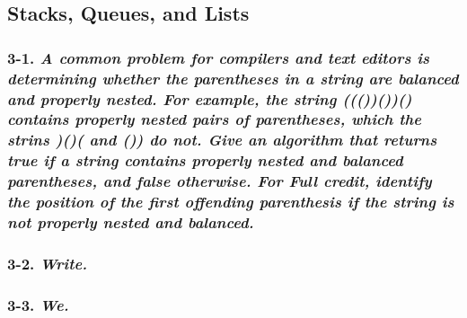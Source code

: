 \subsection{Stacks, Queues, and Lists}

\subsubsection*{\textbf{3-1.} \emph{A common problem for compilers and text editors is determining whether the parentheses in a string are balanced and properly nested. For example, the string ((())())() contains properly nested pairs of parentheses, which the strins )()( and ()) do not. Give an algorithm that returns true if a string contains properly nested and balanced parentheses, and false otherwise. For Full credit, identify the position of the first offending parenthesis if the string is not properly nested and balanced.
}}

\subsubsection*{\textbf{3-2.} \emph{Write.
}}

\subsubsection*{\textbf{3-3.} \emph{We.
}}
